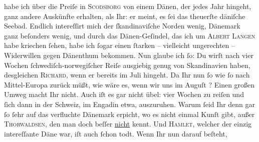 \begin{ledgroupsized}[t]{13cm}
               habe ich über die Preiſe in \textsc{Scodsborg} von einem Dänen, der
               jedes Jahr hingeht, ganz andere Auskünfte erhalten, als Ihr: er meint, es ſei das
               theuerſte däniſche Seebad. Endlich  intereſſirt mich der ſkandinaviſche Norden
               wenig, Dänemark ganz beſonders wenig, {\pb}und durch das Dänen-Geſindel, das ich um \textsc{Albert Langen} habe kriechen ſehen, habe ich ſogar einen ſtarken – vielleicht ungerechten –
               Widerwillen gegen Dänenthum
               bekommen. Nun glaube ich  ſo: Du wirſt nach vier Wochen ſchwediſch-norwegiſcher Reiſe ausgiebig genug von Skandinavien haben, desgleichen \textsc{Richard}, wenn er bereits im {\pb}Juli hingeht. Da Ihr nun ſo wie ſo nach Mittel-Europa zurück müßt, wie wäre es, wenn wir uns im Auguſt{ }\label{K_L02778-1v}\label{K_L02778-1h}? Einen großen Umweg macht Ihr nicht. Auch iſt es gar nicht übel: vier Wochen
               zu reiſen und ſich dann in der Schweiz, im Engadin etwa, auszuruhen. Warum ſeid Ihr denn {\pb}gar ſo
               ſehr auf das verfluchte Dänemark erpicht, wo es nicht einmal Kunſt gibt,
               außer \textsc{Thorwaldsen}, den man doch beſſer \uline{nicht} kennt. Und \textsc{Hamlet}, welcher der einzig intereſſante Däne war, iſt auch ſchon todt. Wenn Ihr nun darauf beſteht,

\end{ledgroupsized}
